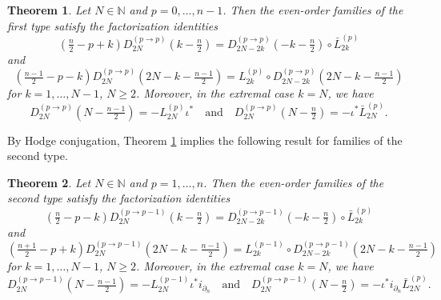 \documentclass[a4paper,12pt,reqno]{amsart}
\newtheorem{theorem}{Theorem}
\numberwithin{theorem}{subsection}
\numberwithin{equation}{section}
\begin{document}
\begin{theorem}\label{MainFactEven1} Let $N \in {\mathbb{N}}$ and $p=0,\dots,n-1$. Then
the even-order families of the first type satisfy the factorization identities
\begin{equation}\label{fact-1b-1}
   (\tfrac{n}{2}\!-\!p\!+\!k) D_{2N}^{(p\to p)} (k\!-\!\tfrac{n}{2})
   = D_{2N-2k}^{(p\to p)}(-k\!-\!\tfrac{n}{2}) \circ \bar{L}_{2k}^{(p)}
\end{equation}
and
\begin{equation}\label{fact-1b-2}
   (\tfrac{n-1}{2}\!-\!p-\!k\!) D_{2N}^{(p\to p)}(2N\!-\!k\!-\!\tfrac{n-1}{2}) =
   L_{2k}^{(p)} \circ D_{2N-2k}^{(p\to p)}(2N\!-\!k\!-\!\tfrac{n-1}{2})
\end{equation}
for $k=1,\dots,N-1$, $N \ge 2$. Moreover, in the extremal case $k=N$, we have
\begin{equation}\label{fact-1}
   D^{(p\to p)}_{2N}(N\!-\!\tfrac{n-1}{2}) = -L^{(p)}_{2N} \iota^* \quad \mbox{and}
   \quad D^{(p\to p)}_{2N}(N\!-\!\tfrac{n}{2}) = -\iota^* \bar{L}^{(p)}_{2N}.
\end{equation}
\end{theorem}

By Hodge conjugation, Theorem \ref{MainFactEven1} implies the following result
for families of the second type.

\begin{theorem}\label{MainFactEven2} Let $N \in {\mathbb{N}}$ and $p=1,\dots,n$. Then the
even-order families of the second type satisfy the factorization identities
\begin{equation}\label{fact-2b-1}
   (\tfrac{n}2\!-\!p\!-\!k) D_{2N}^{(p\to p-1)} (k\!-\!\tfrac n2)
   = D_{2N-2k}^{(p\to p-1)}(-k\!-\!\tfrac n2) \circ \bar{L}_{2k}^{(p)}
\end{equation}
and
\begin{equation}\label{fact-2b-2}
   (\tfrac{n+1}{2}\!-\!p+\!k\!) D_{2N}^{(p\to p-1)}(2N\!-\!k\!-\!\tfrac{n-1}{2})
   = L_{2k}^{(p-1)} \circ D_{2N-2k}^{(p\to p-1)}(2N\!-\!k\!-\!\tfrac{n-1}{2})
\end{equation}
for $k=1,\dots,N-1$, $N \ge 2$. Moreover, in the extremal case $k=N$, we have
\begin{equation}\label{fact-2}
   D^{(p \to p-1)}_{2N}(N\!-\!\tfrac{n-1}{2}) = -L^{(p-1)}_{2N} \iota^* i_{\partial_n} \quad
   \mbox{and} \quad
   D^{(p \to p-1)}_{2N}(N\!-\!\tfrac{n}{2}) = -\iota^* i_{\partial_n} \bar{L}^{(p)}_{2N}.
\end{equation}
\end{theorem}
\end{document}
